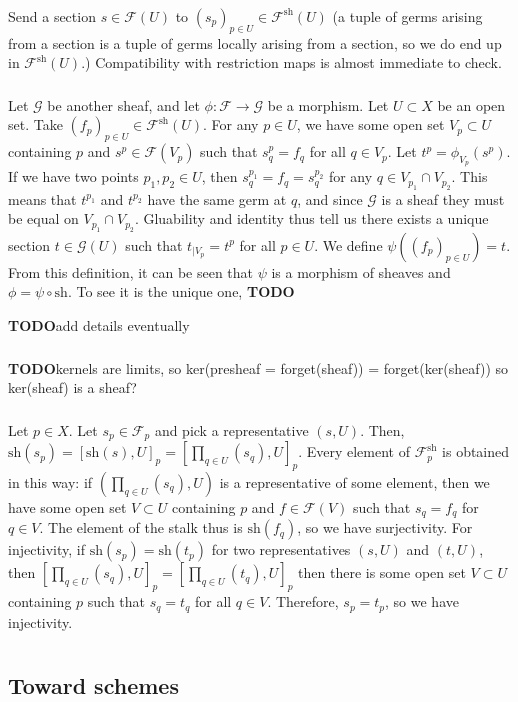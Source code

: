 \documentclass{article}
\newcommand{\sh}{\mathrm{sh}}
\newcommand{\todo}{\textbf{TODO}}
\newcommand{\Fsheaf}{\mathscr{F}}
\newcommand{\Gsheaf}{\mathscr{G}}
\newcommand{\exercise}{\subsubsection} %
\begin{document}
\exercise{} Send a section $s \in \Fsheaf(U)$ to $(s_p)_{p \in U} \in \Fsheaf^\sh(U)$ (a tuple of germs arising from a section is a tuple of germs locally arising from a section, so we do end up in $\Fsheaf^\sh(U)$.) Compatibility with restriction maps is almost immediate to check.

\exercise{} Let $\Gsheaf$ be another sheaf, and let $\phi : \Fsheaf \to \Gsheaf$ be a morphism. Let $U \subset X$ be an open set. Take $(f_p)_{p \in U} \in \Fsheaf^\sh (U)$. For any $p \in U$, we have some open set $V_p \subset U$ containing $p$ and $s^p \in \Fsheaf(V_p)$ such that $s_q^p = f_q$ for all $q \in V_p$. Let $t^p = \phi_{V_p} (s^p)$. If we have two points $p_1,p_2 \in U$, then $s^{p_1}_q = f_q = s^{p_2}_q$ for any $q \in V_{p_1} \cap V_{p_2}$. This means that $t^{p_1}$ and $t^{p_2}$ have the same germ at $q$, and since $\Gsheaf$ is a sheaf they must be equal on $V_{p_1} \cap V_{p_2}$. Gluability and identity thus tell us there exists a unique section $t \in \Gsheaf(U)$ such that $t_{\mid V_p} = t^p$ for all $p \in U$. We define $\psi((f_p)_{p \in U}) = t$. From this definition, it can be seen that $\psi$ is a morphism of sheaves and $\phi = \psi \circ \sh$. To see it is the unique one, \todo

\todo add details eventually

\exercise{} \todo kernels are limits, so ker(presheaf = forget(sheaf)) = forget(ker(sheaf)) so ker(sheaf) is a sheaf?

\exercise{} Let $p \in X$. Let $s_p \in \Fsheaf_p$ and pick a representative $(s,U)$. Then, $\sh(s_p) = [\sh(s),U]_p = [\prod_{q \in U} (s_q),U]_p$. Every element of $\Fsheaf^\sh_p$ is obtained in this way: if $(\prod_{q \in U} (s_q),U)$ is a representative of some element, then we have some open set $V \subset U$ containing $p$ and $f \in \Fsheaf(V)$ such that $s_q = f_q$ for $q \in V$. The element of the stalk thus is $\sh(f_q)$, so we have surjectivity. For injectivity, if $\sh(s_p) = \sh(t_p)$ for two representatives $(s,U)$ and $(t,U)$, then $[\prod_{q \in U} (s_q),U]_p = [\prod_{q \in U} (t_q),U]_p$ then there is some open set $V \subset U$ containing $p$ such that $s_q = t_q$ for all $q \in V$. Therefore, $s_p = t_p$, so we have injectivity.

\exercise{} 

\section{}

\subsection{Toward schemes}
\end{document}
